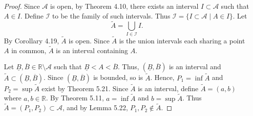 \documentclass{amsart}
\newcommand{\R}{\mathbb R}
\newcommand{\1}{\mathds{1}}
\newcommand{\cA}{\mathcal A}
\def \R {{\mathbb {R}}}
\def \tilde {\widetilde}
\numberwithin{equation}{section}
\numberwithin{theorem}{section}
\begin{document}
\begin{proof}
	Since $\cA$ is open, by Theorem 4.10, there exists an interval $I\subset \cA$ such that $A\in I$. Define $\mathcal{I}$ to be the family of such intervals. Thus $\mathcal{I} = \{I\subset \cA \mid A\in I\}$. Let $$\tilde{A} = \bigcup_{I\in\mathcal{I}}I.$$ By Corollary 4.19, $\tilde{A}$ is open. Since $\tilde{A}$ is the union intervals each sharing a point $A$ in common, $\tilde{A}$ is an interval containing $A$. 
	
	
	Let $\underline B, \overline B \in \R\setminus \cA$ such that $\underline B < A < \overline B$. Thus, $(\underline B,\overline B)$ is an interval and $\tilde{A}\subset (\underline B,\overline B)$. Since $(\underline B,\overline B)$ is bounded, so is $\tilde{A}$. Hence, $P_1 = \inf\tilde{A}$ and $P_2 = \sup\tilde{A}$ exist by Theorem 5.21. Since $\tilde{A}$ is an interval, define $\tilde{A} = (a,b)$ where $a,b\in \R$. By Theorem 5.11, $a = \inf\tilde{A}$ and $b = \sup\tilde{A}$. Thus $\tilde{A} = (P_1,P_2) \subset \cA$, and by Lemma 5.22, $P_1,P_2\notin \tilde{A}$. 
	
	
	
	
	
	
	
\end{proof}
\end{document}
